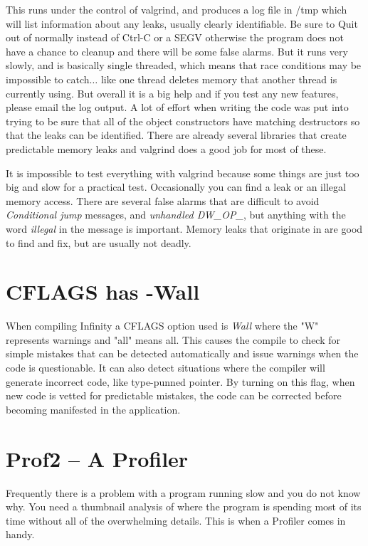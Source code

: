 This runs \CGG{} under the control of valgrind, and produces a log file in /tmp which will list information about any leaks, usually clearly identifiable. Be sure to Quit out of \CGG{} normally instead of Ctrl-C or a SEGV otherwise the program does not have a chance to cleanup and there will be some false alarms. But it runs very slowly, and is basically single threaded, which means that race conditions may be impossible to catch$\dots$ like one thread deletes memory that another thread is currently using. But overall it is a big help and if you test any new features, please email the log output. A lot of effort when writing the code was put into trying to be sure that all of the object constructors have matching destructors so that the leaks can be identified. There are already several libraries that create predictable memory leaks and valgrind does a good job for most of these.

It is impossible to test everything with valgrind because some things are just too big and slow for a practical test. Occasionally you can find a leak or an illegal memory access. There are several false alarms that are difficult to avoid \textit{Conditional jump} messages, and \textit{unhandled DW\_OP\_}, but anything with the word \textit{illegal} in the message is important. Memory leaks that originate in \CGG{} are good to find and fix, but are usually not deadly.

\section{CFLAGS has -Wall}
\label{sec:cflags_has_-wall}
When compiling \CGG{} Infinity a CFLAGS option used is \textit{Wall} where the "W" represents warnings and "all" means all.  This causes the compile to check for simple mistakes that can be detected automatically and issue warnings when the code is questionable.  It can also detect situations where the compiler will generate incorrect code, like type-punned pointer.  By turning on this flag, when new code is vetted for predictable mistakes, the code can be corrected before becoming manifested in the application.

\section{Prof2 -- A Profiler}
\label{sec:prof2_profiler}

Frequently there is a problem with a program running slow and you do not know why. You need a thumbnail analysis of where the program is spending most of its time without all of the overwhelming details. This is when a Profiler comes in handy.

